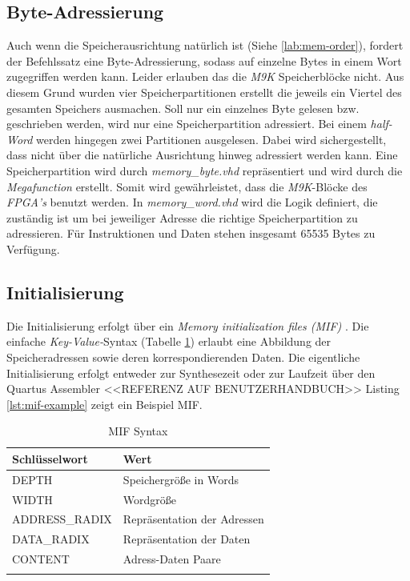             
        \subsection{Byte-Adressierung}
            Auch wenn die Speicherausrichtung natürlich ist (Siehe \ref{lab:mem-order}), fordert der Befehlssatz eine Byte-Adressierung,
            sodass auf einzelne Bytes in einem Wort zugegriffen werden kann. Leider erlauben das die \textit{M9K} Speicherblöcke nicht.
            Aus diesem Grund wurden vier Speicherpartitionen erstellt die jeweils ein Viertel des gesamten Speichers ausmachen.
            Soll nur ein einzelnes Byte gelesen bzw. geschrieben werden, wird nur eine Speicherpartition adressiert.
            Bei einem \textit{half-Word} werden hingegen zwei Partitionen ausgelesen. Dabei wird sichergestellt,
            dass nicht über die natürliche Ausrichtung hinweg adressiert werden kann.
            Eine Speicherpartition wird durch \textit{memory\_byte.vhd} repräsentiert und wird durch die \textit{Megafunction} erstellt.
            Somit wird gewährleistet, dass die \textit{M9K}-Blöcke des \textit{FPGA's} benutzt werden.
            In \textit{memory\_word.vhd} wird die Logik definiert, die zuständig ist um bei jeweiliger Adresse die 
            richtige Speicherpartition zu adressieren.
            Für Instruktionen und Daten stehen insgesamt 65535 Bytes zu Verfügung.

        \subsection{Initialisierung}\label{lab:mif}
            Die Initialisierung erfolgt über ein \textit{Memory initialization files (MIF)} \cite{intel-mif}.
            Die einfache \textit{Key-Value-}Syntax (Tabelle \ref{tab:mif-syntax}) erlaubt eine Abbildung der Speicheradressen sowie deren korrespondierenden Daten.
            Die eigentliche Initialisierung erfolgt entweder zur Synthesezeit oder zur Laufzeit über den Quartus Assembler <<REFERENZ AUF BENUTZERHANDBUCH>>
            Listing \ref{lst:mif-example} zeigt ein Beispiel MIF.
            \begin{center}
                \begin{longtable}{| l | l |}
                    \hline
                        Schlüsselwort & Wert\\
                    \hline
                        DEPTH & Speichergröße in Words\\
                    \hline
                        WIDTH & Wordgröße\\
                    \hline
                        ADDRESS\_RADIX & Repräsentation der Adressen\\
                    \hline
                        DATA\_RADIX & Repräsentation der Daten\\
                    \hline
                        CONTENT & Adress-Daten Paare\\
                    \hline
                    \caption[MIF Syntax]{MIF Syntax}
                    \label{tab:mif-syntax}
                \end{longtable}
            \end{center}

